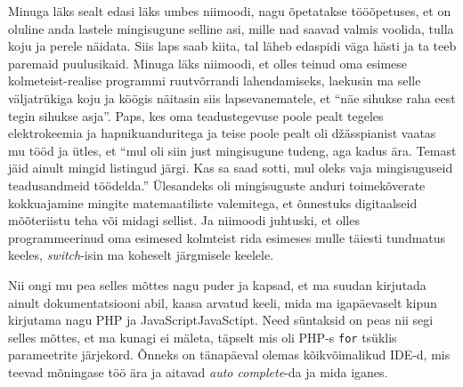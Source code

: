 Minuga läks sealt edasi läks umbes niimoodi, nagu õpetatakse tööõpetuses, et on 
oluline  anda lastele mingisugune selline asi, mille nad saavad valmis voolida, 
tulla koju ja perele näidata. Siis laps saab kiita, tal  läheb edaspidi väga 
hästi ja ta teeb paremaid puulusikaid. Minuga läks niimoodi, et olles teinud 
oma esimese  kolmeteist-realise programmi ruutvõrrandi lahendamiseks, laekusin 
ma  selle väljatrükiga koju ja köögis näitasin siis  lapsevanematele, et 
\enquote{näe sihukse raha eest tegin sihukse asja}. Paps, kes oma 
teadustegevuse poole pealt tegeles elektrokeemia ja hapnikuanduritega ja teise 
poole pealt oli džässpianist vaatas mu tööd ja ütles, et \enquote{mul oli siin 
just mingisugune tudeng, aga kadus ära. Temast jäid ainult mingid listingud 
järgi. Kas sa saad sotti,  mul oleks vaja mingisuguseid  teadusandmeid 
töödelda.} Ülesandeks oli mingisuguste anduri toimekõverate kokkuajamine 
mingite matemaatiliste valemitega, et õnnestuks digitaalseid mõõteriistu teha 
või midagi sellist. Ja niimoodi juhtuski, et olles  programmeerinud oma 
esimesed kolmteist rida esimeses mulle täiesti tundmatus keeles, 
\emph{switch}-isin ma koheselt järgmisele keelele.

Nii ongi mu pea selles mõttes nagu puder ja kapsad, et ma suudan kirjutada 
ainult dokumentatsiooni abil, kaasa arvatud keeli, mida ma igapäevaselt kipun  
kirjutama nagu  PHP ja JavaScript{JavaSctipt}. Need 
süntaksid on peas nii segi selles mõttes, et ma kunagi ei mäleta, täpselt mis 
oli PHP-s  \verb|for| tsüklis  parameetrite järjekord. Õnneks on tänapäeval 
olemas kõikvõimalikud IDE-d, mis teevad mõningase töö ära ja aitavad \emph{auto 
complete}-da ja mida iganes. 


